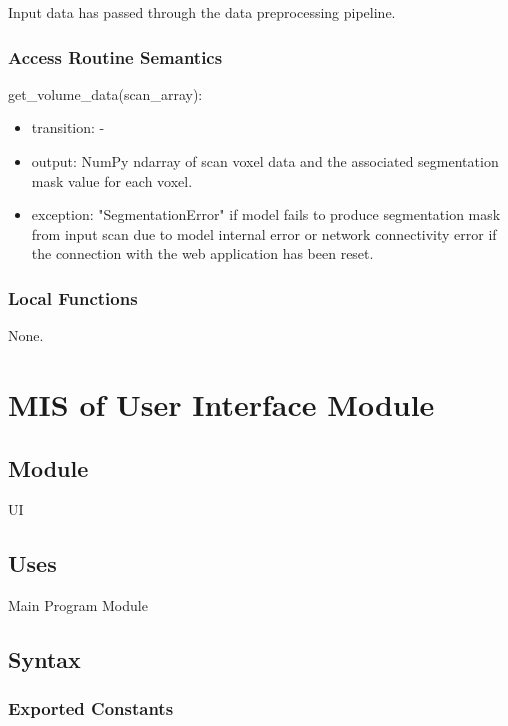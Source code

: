 \documentclass[12pt, titlepage]{article}
\begin{document}
Input data has passed through the data preprocessing pipeline.
\subsubsection{Access Routine Semantics}

\noindent get\_volume\_data(scan\_array):
\begin{itemize}
  \item transition: -
  \item output:  NumPy ndarray of scan voxel data and the associated segmentation mask value for each voxel.
  \item exception: "SegmentationError" if model fails to produce segmentation mask from input scan due to
        model internal error or network connectivity error if the connection with the web application has been reset.
\end{itemize}


\subsubsection{Local Functions}

None.

\newpage

\section{MIS of User Interface Module} \label{UI} 


\subsection{Module}

UI

\subsection{Uses}

Main Program Module


\subsection{Syntax}

\subsubsection{Exported Constants}
\end{document}
